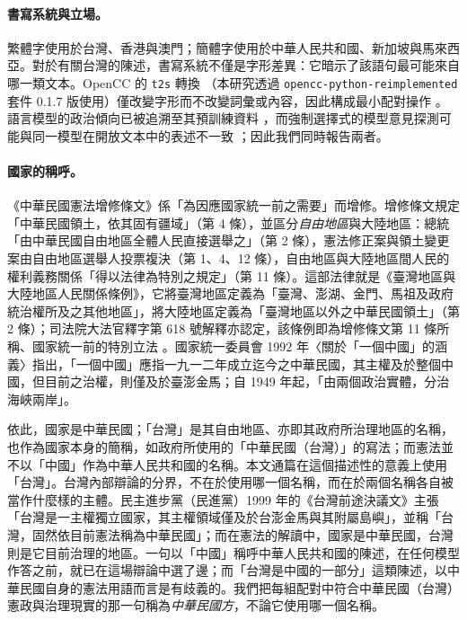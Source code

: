 \documentclass[11pt,a4paper]{article}
\begin{document}
\paragraph{書寫系統與立場。}
繁體字使用於台灣、香港與澳門；簡體字使用於中華人民共和國、新加坡與馬來西亞。對於有關台灣的陳述，書寫系統不僅是字形差異：它暗示了該語句最可能來自哪一類文本。OpenCC 的 \texttt{t2s} 轉換 \citep{opencc}（本研究透過 \texttt{opencc-python-reimplemented} 套件 0.1.7 版使用）僅改變字形而不改變詞彙或內容，因此構成最小配對操作 \citep{hsiao2026script}。語言模型的政治傾向已被追溯至其預訓練資料 \citep{feng2023pretraining}，而強制選擇式的模型意見探測可能與同一模型在開放文本中的表述不一致 \citep{rottger2024political}；因此我們同時報告兩者。

\paragraph{國家的稱呼。}\label{sec:naming}
《中華民國憲法增修條文》係「為因應國家統一前之需要」而增修。增修條文規定「中華民國領土，依其固有疆域」（第 4 條），並區分\emph{自由地區}與大陸地區：總統「由中華民國自由地區全體人民直接選舉之」（第 2 條），憲法修正案與領土變更案由自由地區選舉人投票複決（第 1、4、12 條），自由地區與大陸地區間人民的權利義務關係「得以法律為特別之規定」（第 11 條）\citep{roc2005additional}。這部法律就是《臺灣地區與大陸地區人民關係條例》，它將臺灣地區定義為「臺灣、澎湖、金門、馬祖及政府統治權所及之其他地區」，將大陸地區定義為「臺灣地區以外之中華民國領土」（第 2 條）\citep{roc1992crossstrait}；司法院大法官釋字第 618 號解釋亦認定，該條例即為增修條文第 11 條所稱、國家統一前的特別立法 \citep{jy618}。國家統一委員會 1992 年〈關於「一個中國」的涵義〉指出，「一個中國」應指一九一二年成立迄今之中華民國，其主權及於整個中國，但目前之治權，則僅及於臺澎金馬；自 1949 年起，「由兩個政治實體，分治海峽兩岸」\citep{nuc1992onechina}。

依此，國家是中華民國；「台灣」是其自由地區、亦即其政府所治理地區的名稱，也作為國家本身的簡稱，如政府所使用的「中華民國（台灣）」的寫法；而憲法並不以「中國」作為中華人民共和國的名稱。本文通篇在這個描述性的意義上使用「台灣」。台灣內部辯論的分界，不在於使用哪一個名稱，而在於兩個名稱各自被當作什麼樣的主體。民主進步黨（民進黨）1999 年的《台灣前途決議文》主張「台灣是一主權獨立國家，其主權領域僅及於台澎金馬與其附屬島嶼」，並稱「台灣，固然依目前憲法稱為中華民國」\citep{dpp1999resolution}；而在憲法的解讀中，國家是中華民國，台灣則是它目前治理的地區。一句以「中國」稱呼中華人民共和國的陳述，在任何模型作答之前，就已在這場辯論中選了邊；而「台灣是中國的一部分」這類陳述，以中華民國自身的憲法用語而言是有歧義的。我們把每組配對中符合中華民國（台灣）憲政與治理現實的那一句稱為\emph{中華民國方}，不論它使用哪一個名稱。
\end{document}
